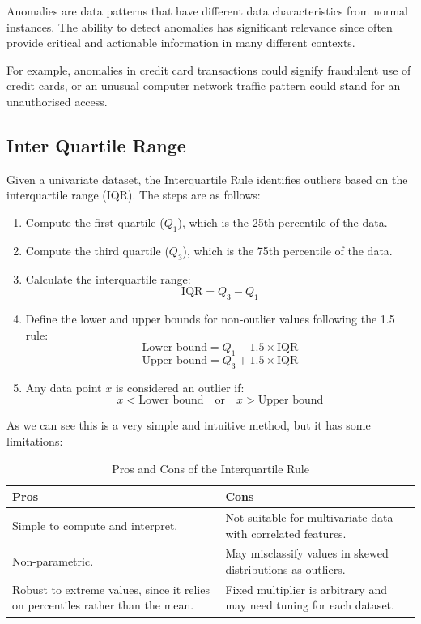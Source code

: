 \documentclass[11pt,english,a4paper,hidelinks]{book}
\begin{document}
Anomalies are data patterns that have different data characteristics from normal
instances. The ability to detect anomalies has significant relevance since often provide critical and actionable information in many different contexts.

\vspace{0.5cm}
\noindent For example, anomalies in credit card transactions could signify fraudulent use of
credit cards, or an unusual computer network traffic pattern could stand for an
unauthorised access.


\subsection{Inter Quartile Range}

Given a univariate dataset, the Interquartile Rule identifies outliers based on the interquartile range (IQR). The steps are as follows:

\begin{enumerate}
    \item Compute the first quartile ($Q_1$), which is the 25th percentile of the data.
    \item Compute the third quartile ($Q_3$), which is the 75th percentile of the data.
    \item Calculate the interquartile range:
    \[
        \text{IQR} = Q_3 - Q_1
    \]
    \item Define the lower and upper bounds for non-outlier values following the 1.5 rule:
    \[
        \text{Lower bound} = Q_1 - 1.5 \times \text{IQR}
    \]
    \[
        \text{Upper bound} = Q_3 + 1.5 \times \text{IQR}
    \]
    \item Any data point $x$ is considered an outlier if:
    \[
        x < \text{Lower bound} \quad \text{or} \quad x > \text{Upper bound}
    \]
\end{enumerate}

\noindent As we can see this is a very simple and intuitive method, but it has some limitations:

\begin{table}[H]
    \centering
    \begin{tabular}{|p{7cm}|p{7cm}|}
    \hline
    \textbf{Pros} & \textbf{Cons} \\
    \hline
    Simple to compute and interpret. & Not suitable for multivariate data with correlated features. \\
    \hline
    Non-parametric. & May misclassify values in skewed distributions as outliers. \\
    \hline
    Robust to extreme values, since it relies on percentiles rather than the mean. & Fixed multiplier is arbitrary and may need tuning for each dataset. \\
    \hline
    \end{tabular}
    \caption{Pros and Cons of the Interquartile Rule}
\end{table}
\end{document}
